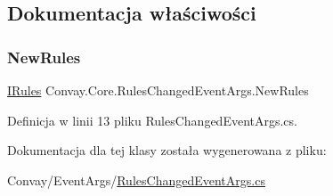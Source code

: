 \subsection{Dokumentacja właściwości}
\hypertarget{class_convay_1_1_core_1_1_rules_changed_event_args_a6f1fa511ac4ab4723cca164dc1aee683}{}\label{class_convay_1_1_core_1_1_rules_changed_event_args_a6f1fa511ac4ab4723cca164dc1aee683} 
\subsubsection{\texorpdfstring{New\+Rules}{NewRules}}
{\footnotesize\ttfamily \hyperlink{interface_convay_1_1_core_1_1_interfaces_1_1_i_rules}{I\+Rules} Convay.\+Core.\+Rules\+Changed\+Event\+Args.\+New\+Rules\hspace{0.3cm}{\ttfamily [get]}}



Definicja w linii 13 pliku Rules\+Changed\+Event\+Args.\+cs.



Dokumentacja dla tej klasy została wygenerowana z pliku\+:\begin{DoxyCompactItemize}
\item 
Convay/\+Event\+Args/\hyperlink{_rules_changed_event_args_8cs}{Rules\+Changed\+Event\+Args.\+cs}\end{DoxyCompactItemize}
